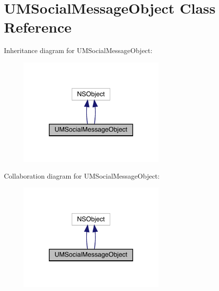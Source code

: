 \hypertarget{interface_u_m_social_message_object}{}\section{U\+M\+Social\+Message\+Object Class Reference}
\label{interface_u_m_social_message_object}


Inheritance diagram for U\+M\+Social\+Message\+Object\+:\nopagebreak
\begin{figure}[H]
\begin{center}
\leavevmode
\includegraphics[width=208pt]{interface_u_m_social_message_object__inherit__graph}
\end{center}
\end{figure}


Collaboration diagram for U\+M\+Social\+Message\+Object\+:\nopagebreak
\begin{figure}[H]
\begin{center}
\leavevmode
\includegraphics[width=208pt]{interface_u_m_social_message_object__coll__graph}
\end{center}
\end{figure}
